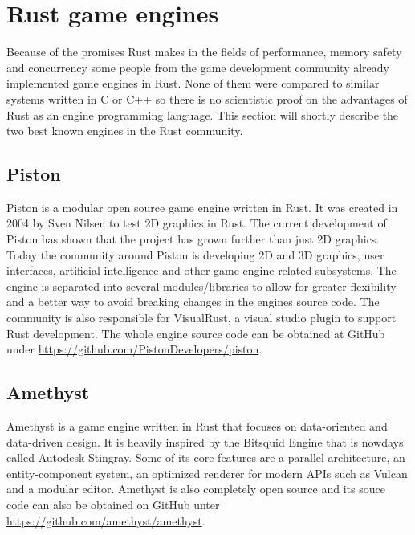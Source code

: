 \documentclass[lnbip]{svmultln}
\begin{document}
\section{Rust game engines}

Because of the promises Rust makes in the fields of performance, memory safety and concurrency some people from the game development community already implemented game engines in Rust. None of them were compared to similar systems written in C or C++ so there is no scientistic proof on the advantages of Rust as an engine programming language. This section will shortly describe the two best known engines in the Rust community.

\subsection{Piston}
Piston is a modular open source game engine written in Rust. It was created in 2004 by Sven Nilsen to test 2D graphics in Rust. The current development of Piston has shown that the project has grown further than just 2D graphics. Today the community around Piston is developing 2D and 3D graphics, user interfaces, artificial intelligence and other game engine related subsystems. The engine is separated into several modules/libraries to allow for greater flexibility and a better way to avoid breaking changes in the engines source code. The community is also responsible for VisualRust, a visual studio plugin to support Rust development. The whole engine source code can be obtained at GitHub under \url{https://github.com/PistonDevelopers/piston}.

\subsection{Amethyst}
Amethyst is a game engine written in Rust that focuses on data-oriented and data-driven design. It is heavily inspired by the Bitsquid Engine that is nowdays called Autodesk Stingray. Some of its core features are a parallel architecture, an entity-component system, an optimized renderer for modern APIs such as Vulcan and a modular editor. Amethyst is also completely open source and its souce code can also be obtained on GitHub unter \url{https://github.com/amethyst/amethyst}.

%
%



%
\end{document}

